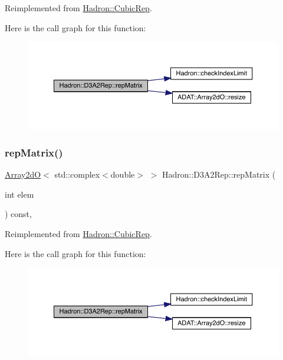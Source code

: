 Reimplemented from \mbox{\hyperlink{structHadron_1_1CubicRep_ac5d7e9e6f4ab1158b5fce3e4ad9e8005}{Hadron\+::\+Cubic\+Rep}}.

Here is the call graph for this function\+:
\nopagebreak
\begin{figure}[H]
\begin{center}
\leavevmode
\includegraphics[width=350pt]{d5/d7f/structHadron_1_1D3A2Rep_a0e868a4c14c9126108a49d429add3c94_cgraph}
\end{center}
\end{figure}
\mbox{\label{structHadron_1_1D3A2Rep_a0e868a4c14c9126108a49d429add3c94}} 
\subsubsection{\texorpdfstring{repMatrix()}{repMatrix()}\hspace{0.1cm}{\footnotesize\ttfamily [3/3]}}
{\footnotesize\ttfamily \mbox{\hyperlink{classADAT_1_1Array2dO}{Array2dO}}$<$ std\+::complex$<$double$>$ $>$ Hadron\+::\+D3\+A2\+Rep\+::rep\+Matrix (\begin{DoxyParamCaption}\item[{int}]{elem }\end{DoxyParamCaption}) const\hspace{0.3cm}{\ttfamily [inline]}, {\ttfamily [virtual]}}



Reimplemented from \mbox{\hyperlink{structHadron_1_1CubicRep_ac5d7e9e6f4ab1158b5fce3e4ad9e8005}{Hadron\+::\+Cubic\+Rep}}.

Here is the call graph for this function\+:
\nopagebreak
\begin{figure}[H]
\begin{center}
\leavevmode
\includegraphics[width=350pt]{d5/d7f/structHadron_1_1D3A2Rep_a0e868a4c14c9126108a49d429add3c94_cgraph}
\end{center}
\end{figure}


